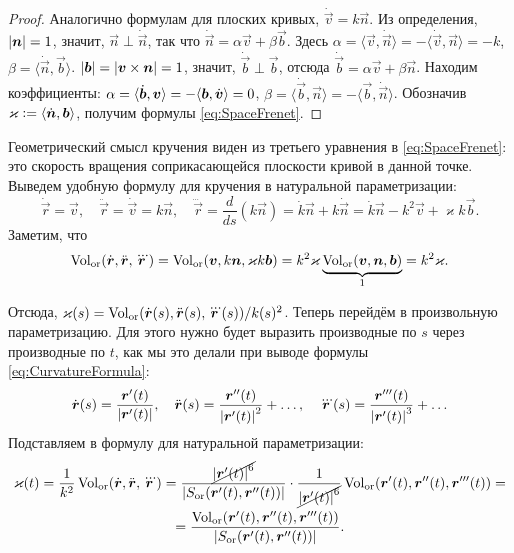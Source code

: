 \begin{proof}
	Аналогично формулам для плоских кривых, $\dot{\vec{v}} = k\vec{n}$. Из определения, $\abs{\vec{n}} = 1$, значит, $\vec{n} \perp \dot{\vec{n}}$, так что $\dot{\vec{n}} = \alpha\vec{v} + \beta\vec{b}$. Здесь $\alpha = \langle\vec{v}, \dot{\vec{n}}\rangle = -\langle\dot{\vec{v}}, \vec{n}\rangle = -k$, $\beta = \langle\dot{\vec{n}}, \vec{b}\rangle$. $\abs{\vec{b}} = \abs{\vec{v} \times \vec{n}} = 1$, значит, $\dot{\vec{b}} \perp \vec{b}$, отсюда $\dot{\vec{b}} = \alpha\vec{v} + \beta\vec{n}$. Находим коэффициенты: $\alpha = \langle \dot{\vec{b}}, \vec{v} \rangle \hm= -\langle\vec{b}, \dot{\vec{v}}\rangle = 0$, $\beta = \langle\dot{\vec{b}}, \vec{n}\rangle = -\langle \vec{b}, \dot{\vec{n}}\rangle$. Обозначив $\varkappa \vcentcolon = \langle\dot{\vec{n}}, \vec{b}\rangle$, получим формулы \eqref{eq:SpaceFrenet}.
\end{proof}

Геометрический смысл кручения виден из третьего уравнения в \eqref{eq:SpaceFrenet}: это скорость вращения соприкасающейся плоскости кривой в данной точке. Выведем удобную формулу для кручения в натуральной параметризации:
\[
	\dot{\vec{r}} = \vec{v},\quad \ddot{\vec{r}} = \dot{\vec{v}} = k\vec{n},\quad \dddot{\vec{r}} = \frac{d}{ds}(k\vec{n}) = \dot{k}\vec{n} + k\dot{\vec{n}} = \dot{k}\vec{n} - k^2\vec{v} + \varkappa k\vec{b}.
\]
Заметим, что
\[
	\Vol_{\Or}(\dot{\vec{r}}, \ddot{\vec{r}}, \dddot{\vec{r}}) = \Vol_{\Or}(\vec{v}, k\vec{n}, \varkappa k\vec{b}) = k^2\varkappa \underbrace{\Vol_{\Or}(\vec{v}, \vec{n}, \vec{b})}_1 = k^2\varkappa.
\]

Отсюда, $\varkappa(s) = \Vol_{\Or}(\dot{\vec{r}}(s), \ddot{\vec{r}}(s), \dddot{\vec{r}}(s)) / k(s)^2$. Теперь перейдём в произвольную параметризацию. Для этого нужно будет выразить производные по $s$ через производные по $t$, как мы это делали при выводе формулы \eqref{eq:CurvatureFormula}:
\[
	\dot{\vec{r}}(s) = \frac{\vec{r}^\prime(t)}{\abs{\vec{r}^\prime(t)}},\quad \ddot{\vec{r}}(s) = \frac{\vec{r}^{\prime\prime}(t)}{\abs{\vec{r}^\prime(t)}^2}+ \ldots,\quad \dddot{\vec{r}}(s) = \frac{\vec{r}^{\prime\prime\prime}(t)}{\abs{\vec{r}^\prime(t)}^3} + \ldots
\]
Подставляем в формулу для натуральной параметризации:
\begin{multline} \label{eq:TorsionFormula}
	\varkappa(t) = \frac{1}{k^2}\Vol_{\Or}(\dot{\vec{r}}, \ddot{\vec{r}}, \dddot{\vec{r}}) = \frac{\cancel{\abs{\vec{r}^\prime(t)}^6}}{\abs{S_{\Or}(\vec{r}^\prime(t), \vec{r}^{\prime\prime}(t))}} \cdot \frac{1}{\cancel{\abs{\vec{r}^\prime(t)}^6}}\Vol_{\Or}(\vec{r}^\prime(t), \vec{r}^{\prime\prime}(t), \vec{r}^{\prime\prime\prime}(t)) =\\ = \frac{\Vol_{\Or}(\vec{r}^\prime(t), \vec{r}^{\prime\prime}(t), \vec{r}^{\prime\prime\prime}(t))}{\abs{S_{\Or}(\vec{r}^\prime(t), \vec{r}^{\prime\prime}(t))}}.
\end{multline}

